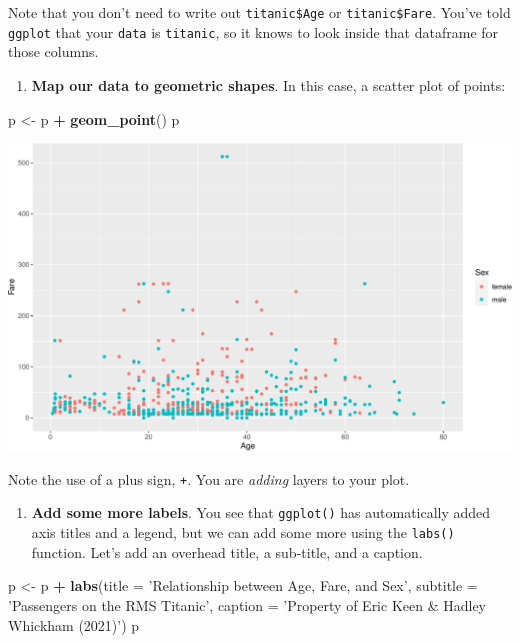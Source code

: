 \documentclass[
]{book}
\newenvironment{Shaded}{\begin{snugshade}}{\end{snugshade}}
\newcommand{\DataTypeTok}[1]{\textcolor[rgb]{0.13,0.29,0.53}{#1}}
\newcommand{\KeywordTok}[1]{\textcolor[rgb]{0.13,0.29,0.53}{\textbf{#1}}}
\newcommand{\NormalTok}[1]{#1}
\newcommand{\OperatorTok}[1]{\textcolor[rgb]{0.81,0.36,0.00}{\textbf{#1}}}
\newcommand{\StringTok}[1]{\textcolor[rgb]{0.31,0.60,0.02}{#1}}
\providecommand{\tightlist}{%
  \setlength{\itemsep}{0pt}\setlength{\parskip}{0pt}}
\begin{document}
Note that you don't need to write out \texttt{titanic\$Age} or \texttt{titanic\$Fare}. You've told \texttt{ggplot} that your \texttt{data} is \texttt{titanic}, so it knows to look inside that dataframe for those columns.

\begin{enumerate}
\def\labelenumi{(\arabic{enumi})}
\setcounter{enumi}{3}
\tightlist
\item
  \textbf{Map our data to geometric shapes}. In this case, a scatter plot of points:
\end{enumerate}

\begin{Shaded}
\begin{Highlighting}[]
\NormalTok{p <-}\StringTok{ }\NormalTok{p }\OperatorTok{+}\StringTok{ }\KeywordTok{geom_point}\NormalTok{()}
\NormalTok{p}
\end{Highlighting}
\end{Shaded}

\includegraphics{figures/unnamed-chunk-250-1.pdf}

Note the use of a plus sign, \texttt{+}. You are \emph{adding} layers to your plot.

\begin{enumerate}
\def\labelenumi{(\arabic{enumi})}
\setcounter{enumi}{4}
\tightlist
\item
  \textbf{Add some more labels}. You see that \texttt{ggplot()} has automatically added axis titles and a legend, but we can add some more using the \texttt{labs()} function. Let's add an overhead title, a sub-title, and a caption.
\end{enumerate}

\begin{Shaded}
\begin{Highlighting}[]
\NormalTok{p <-}\StringTok{ }\NormalTok{p }\OperatorTok{+}\StringTok{ }\KeywordTok{labs}\NormalTok{(}\DataTypeTok{title =} \StringTok{'Relationship between Age, Fare, and Sex'}\NormalTok{,}
              \DataTypeTok{subtitle =} \StringTok{'Passengers on the RMS Titanic'}\NormalTok{,}
              \DataTypeTok{caption =} \StringTok{'Property of Eric Keen & Hadley Whickham (2021)'}\NormalTok{)}
\NormalTok{p}
\end{Highlighting}
\end{Shaded}
\end{document}
